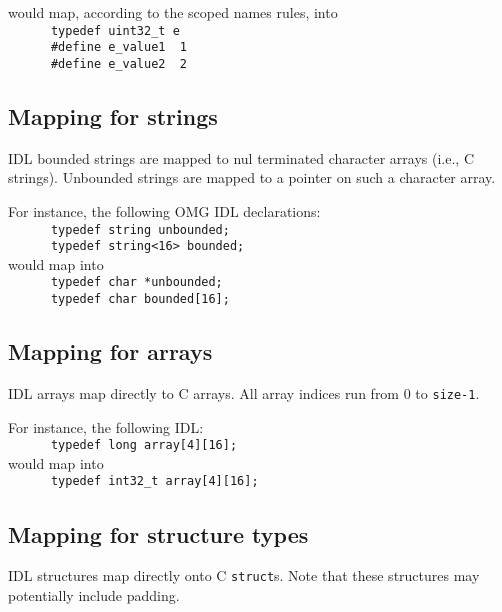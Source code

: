 would map, according to the scoped names rules, into\hfill\\
\verb|      typedef uint32_t e|\hfill\\
\verb|      #define e_value1  1|\hfill\\
\verb|      #define e_value2  2|\hfill\\


\subsection{Mapping for strings}

\GenoM{}  IDL bounded  strings are  mapped to  nul terminated  character arrays
(i.e., C strings). Unbounded strings are mapped to a pointer on such a
character array.

For instance, the following OMG IDL declarations:\hfill\\
\verb|      typedef string unbounded;|\hfill\\
\verb|      typedef string<16> bounded;|\hfill\\

would map into\hfill\\
\verb|      typedef char *unbounded;|\hfill\\
\verb|      typedef char bounded[16];|\hfill\\


\subsection{Mapping for arrays}

\GenoM{} IDL arrays map directly to C arrays. All array indices run from 0 to
{\tt size-1}.

For instance, the following IDL:\hfill\\
\verb|      typedef long array[4][16];|\hfill\\

would map into\hfill\\
\verb|      typedef int32_t array[4][16];|\hfill\\


\subsection{Mapping for structure types}

\GenoM{}  IDL structures map  directly onto  C {\tt  struct}s. Note  that these
structures  may  potentially  include  padding.

